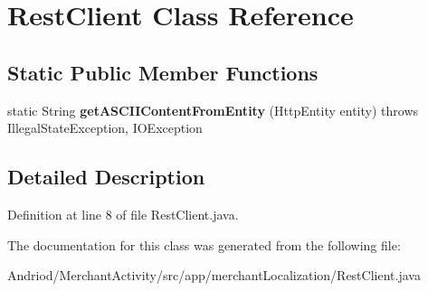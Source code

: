 \hypertarget{classapp_1_1merchant_localization_1_1_rest_client}{\section{Rest\-Client Class Reference}
\label{classapp_1_1merchant_localization_1_1_rest_client}
}
\subsection*{Static Public Member Functions}
\begin{DoxyCompactItemize}
\item 
\hypertarget{classapp_1_1merchant_localization_1_1_rest_client_a2d392fc914b10e3984e550344526dc0a}{static String {\bfseries get\-A\-S\-C\-I\-I\-Content\-From\-Entity} (Http\-Entity entity)  throws Illegal\-State\-Exception, I\-O\-Exception }\label{classapp_1_1merchant_localization_1_1_rest_client_a2d392fc914b10e3984e550344526dc0a}

\end{DoxyCompactItemize}


\subsection{Detailed Description}


Definition at line 8 of file Rest\-Client.\-java.



The documentation for this class was generated from the following file\-:\begin{DoxyCompactItemize}
\item 
Andriod/\-Merchant\-Activity/src/app/merchant\-Localization/Rest\-Client.\-java\end{DoxyCompactItemize}
